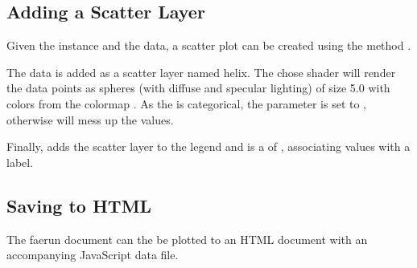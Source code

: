 \documentclass[letterpaper,10pt,english]{sphinxmanual}
\begin{document}
\subsection{Adding a Scatter Layer}
\label{\detokenize{tutorial:adding-a-scatter-layer}}
Given the  instance and the data, a scatter plot can be created using the method .

\begin{sphinxVerbatim}[commandchars=\\\{\}]
    
                \PYG{p}{[}   \PYG{p}{]}
\end{sphinxVerbatim}

The data is added as a scatter layer named helix. The chose shader will render the data points as
spheres (with diffuse and specular lighting) of size 5.0 with colors from the  colormap .
As the  is categorical, the parameter  is set to , otherwise  will mess up the values.

Finally,  adds the scatter layer to the legend and  is a  of , associating values with a label.


\subsection{Saving to HTML}
\label{\detokenize{tutorial:saving-to-html}}
The faerun document can the be plotted to an HTML document with an accompanying JavaScript data file.
\end{document}
